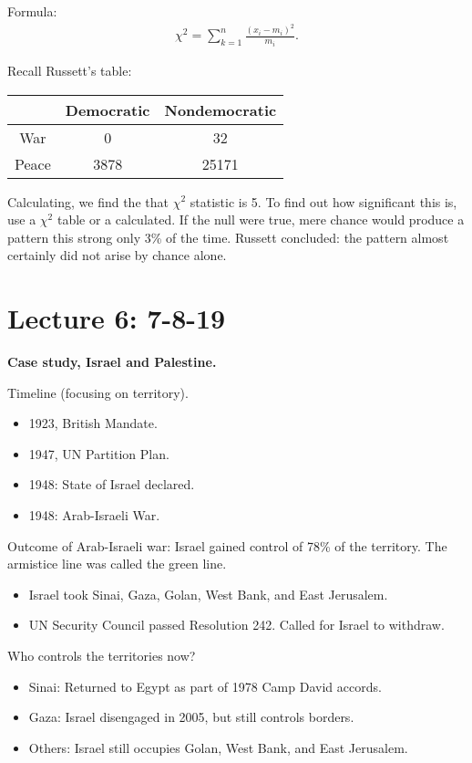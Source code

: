 \documentclass{article}
\begin{document}
Formula:
\begin{align*}
  \chi^2 = \sum_{k=1}^{n} \frac{(x_i - m_i)^2}{m_i}.
\end{align*}

Recall Russett's table:


\begin{tabular}{|c|c|c|}
  \hline
  & Democratic & Nondemocratic \\ \hline
  War & 0 & 32 \\ \hline
  Peace & 3878 & 25171 \\ \hline
\end{tabular}

Calculating, we find the that $\chi^2$ statistic is 5. To find out how significant this is, use a $\chi^2$ table or a calculated.  If the null were true, mere chance would produce a pattern this strong only 3\% of the time.  Russett concluded: the pattern almost certainly did not arise by chance alone.

\section{Lecture 6: 7-8-19}

{\bf Case study, Israel and Palestine.}

Timeline (focusing on territory).

\begin{itemize}
  \item 1923, British Mandate.
  \item 1947, UN Partition Plan.
  \item 1948: State of Israel declared.
  \item 1948: Arab-Israeli War.
\end{itemize}

Outcome of Arab-Israeli war: Israel gained control of 78\% of the territory.  The armistice line was called the green line.

\begin{itemize}
  \item Israel took Sinai, Gaza, Golan, West Bank, and East Jerusalem.
  \item UN Security Council passed Resolution 242.  Called for Israel to withdraw.
\end{itemize}

Who controls the territories now?

\begin{itemize}
  \item Sinai: Returned to Egypt as part of 1978 Camp David accords.
  \item Gaza: Israel disengaged in 2005, but still controls borders.
  \item Others: Israel still occupies Golan, West Bank, and East Jerusalem.
\end{itemize}
\end{document}
